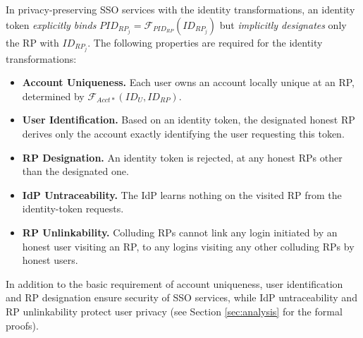 In privacy-preserving SSO services with the identity transformations,
    an identity token \emph{explicitly binds} $PID_{RP_j} = \mathcal{F}_{PID_{RP}}(ID_{RP_j})$ but \emph{implicitly designates} only the RP with $ID_{RP_j}$.
The following properties are required for the identity transformations:
\begin{itemize}
\setlength{\topsep}{0pt}
\setlength{\partopsep}{0pt}
\setlength{\itemsep}{0pt}
\setlength{\parsep}{0pt}
\setlength{\parskip}{0pt}

\item \textbf{Account Uniqueness.} Each user owns an account locally unique at an RP, determined by $\mathcal{F}_{Acct\ast}(ID_{U}, ID_{RP})$.
\item \textbf{User Identification.} Based on an identity token,
    the designated honest RP derives only the account exactly identifying the user requesting this token.
\item \textbf{RP Designation.} 
An identity token is rejected, at any honest RPs other than the designated one.

\item \textbf{IdP Untraceability.}
The IdP learns nothing on the visited RP from the identity-token requests.

\item \textbf{RP Unlinkability.}
Colluding RPs 
 cannot link any login initiated by an honest user visiting an RP,
  to any logins visiting any other colluding RPs by honest users.
\end{itemize}

In addition to the basic requirement of account uniqueness,
    user identification and RP designation ensure security of SSO services,
    while IdP untraceability and RP unlinkability protect user privacy
(see Section \ref{sec:analysis} for the formal proofs). 